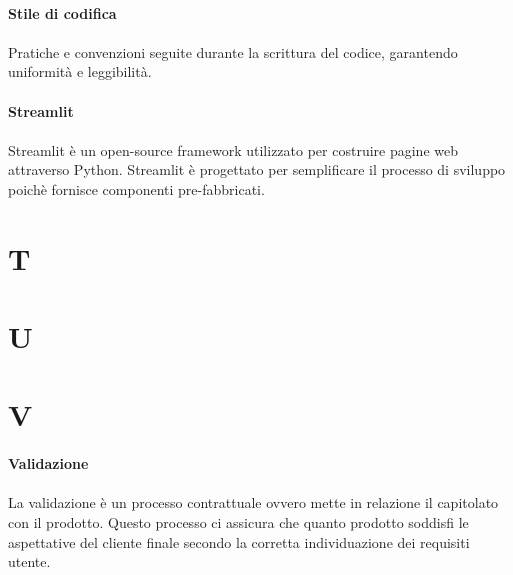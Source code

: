 \documentclass[10pt, a4paper]{article}
\begin{document}
\vspace{2em}
\paragraph{Stile di codifica}\noindent\hrulefill
\paragraph{}Pratiche e convenzioni seguite durante la scrittura del codice, garantendo uniformità e leggibilità.


\paragraph{Streamlit}\noindent\hrulefill
\paragraph{}Streamlit è un open-source framework utilizzato per costruire pagine web attraverso Python. Streamlit è progettato per semplificare il processo di sviluppo poichè fornisce componenti pre-fabbricati.

\newpage
\section{T}



\newpage
\section{U}








\newpage
\section{V}
\vspace{2em}
\paragraph{Validazione}\noindent\hrulefill
\paragraph{}La validazione è un processo contrattuale ovvero mette in relazione il capitolato con il prodotto. Questo processo ci assicura che quanto prodotto soddisfi le aspettative del cliente finale secondo la corretta individuazione dei requisiti utente.
\end{document}
